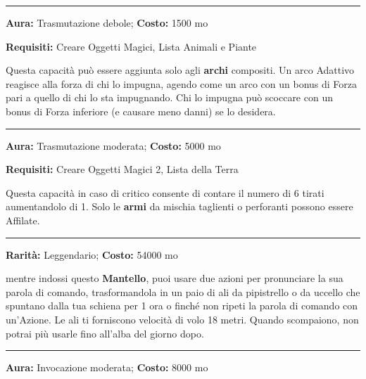 \begin{multicols}{2}
\smallskip\noindent\rule{\linewidth}{2pt}  \hypertarget{Adattiva}{}\medskip{}\noindent\label{Adattiva}

\textbf{Aura:} Trasmutazione debole; \textbf{Costo:} 1500 mo

\textbf{Requisiti:} Creare Oggetti Magici, Lista Animali e Piante

Questa capacità può essere aggiunta solo agli \textbf{archi} compositi. Un arco Adattivo reagisce alla forza di chi lo impugna, agendo come un arco con un bonus di Forza pari a quello di chi lo sta impugnando. Chi lo impugna può scoccare con un bonus di Forza inferiore (e causare meno danni) se lo desidera.

\smallskip\noindent\rule{\linewidth}{2pt}  \hypertarget{Affilata}{}\medskip{}\noindent\label{Affilata}

\textbf{Aura:} Trasmutazione moderata; \textbf{Costo:} 5000 mo

\textbf{Requisiti:} Creare Oggetti Magici 2, Lista della Terra

Questa capacità in caso di critico consente di contare il numero di 6 tirati aumentandolo di 1. Solo le \textbf{armi} da mischia taglienti o perforanti possono essere Affilate.

\smallskip\noindent\rule{\linewidth}{2pt}  \hypertarget{AlidelVolo}{}\medskip{}\noindent\label{AlidelVolo}

\textbf{Rarità:} Leggendario; \textbf{Costo:} 54000 mo

mentre indossi questo \textbf{Mantello}, puoi usare due azioni per pronunciare la sua parola di comando, trasformandola in un paio di ali da pipistrello o da uccello che spuntano dalla tua schiena per 1 ora o finché non ripeti la parola di comando con un'Azione. Le ali ti forniscono velocità di volo 18 metri. Quando scompaiono, non potrai più usarle fino all'alba del giorno dopo.

\smallskip\noindent\rule{\linewidth}{2pt}  \hypertarget{AmmazzaDraghi}{}\medskip{}\noindent\label{AmmazzaDraghi}

\textbf{Aura:} Invocazione moderata; \textbf{Costo:} 8000 mo


\end{multicols}
